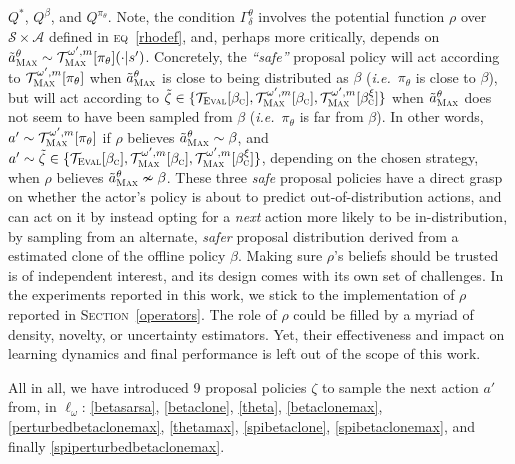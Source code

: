 $Q^*$, $Q^\beta$, and $Q^{\pi_\theta}$.
Note, the condition $\Gamma^\theta_\delta$ involves the potential function $\rho$ over
$\mathcal{S} \times \mathcal{A}$ defined in \textsc{eq}~\ref{rhodef}, and, perhaps more critically,
depends on $\tilde{a}^\theta_\textsc{Max}
\sim \mathcal{T}_\textsc{Max}^{\omega', m}[\pi_\theta](\cdot | s')$.
Concretely, the \textit{``safe''} proposal policy will act according to
$\mathcal{T}_\textsc{Max}^{\omega', m}[\pi_\theta]$ when $\tilde{a}^\theta_\textsc{Max}$ is close to
being distributed as $\beta$ (\textit{i.e.}~$\pi_\theta$ is close to $\beta$),
but will act according to $\tilde{\zeta} \in \{
\mathcal{T}_\textsc{Eval}[\beta_\textsc{c}],
\mathcal{T}_\textsc{Max}^{\omega',m}[\beta_\textsc{c}],
\mathcal{T}_\textsc{Max}^{\omega',m}[\beta_\textsc{c}^\xi]
\}$ when $\tilde{a}^\theta_\textsc{Max}$ does not seem to have been sampled from $\beta$
(\textit{i.e.}~$\pi_\theta$ is far from $\beta$).
In other words,
$a' \sim \mathcal{T}_\textsc{Max}^{\omega', m}[\pi_\theta]$
if $\rho$ believes $\tilde{a}^\theta_\textsc{Max} \sim \beta$,
and $a' \sim \tilde{\zeta} \in \{
\mathcal{T}_\textsc{Eval}[\beta_\textsc{c}],
\mathcal{T}_\textsc{Max}^{\omega',m}[\beta_\textsc{c}],
\mathcal{T}_\textsc{Max}^{\omega',m}[\beta_\textsc{c}^\xi]
\}$, depending on the chosen strategy, when $\rho$ believes $\tilde{a}^\theta_\textsc{Max} \nsim \beta$.
These three \textit{safe} proposal policies have a direct grasp on whether the actor's policy is about to
predict out-of-distribution actions, and can act on it by instead opting for a \textit{next} action more
likely to be in-distribution, by sampling from an alternate, \textit{safer} proposal
distribution derived from a estimated clone of the offline policy $\beta$.
Making sure $\rho$'s beliefs should be trusted is of independent interest, and its design
comes with its own set of challenges.
In the experiments reported in this work, we stick to the implementation of $\rho$ reported in
\textsc{Section}~\ref{operators}.
The role of $\rho$ could be filled by a myriad of density, novelty, or uncertainty estimators.
Yet, their effectiveness and impact on learning dynamics and final performance
is left out of the scope of this work.

All in all, we have introduced 9 proposal policies $\zeta$ to sample
the next action $a'$ from, in $\ell_\omega$:
\ref{betasarsa}, \ref{betaclone}, \ref{theta},
\ref{betaclonemax}, \ref{perturbedbetaclonemax}, \ref{thetamax},
\ref{spibetaclone}, \ref{spibetaclonemax}, and finally \ref{spiperturbedbetaclonemax}.

